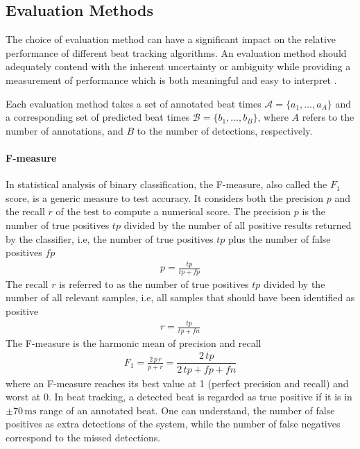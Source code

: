 \documentclass{scrartcl}
\begin{document}
\subsection{Evaluation Methods}

The choice of evaluation method can have a significant impact on the relative performance of different beat tracking algorithms. An evaluation method should adequately contend with the inherent uncertainty or ambiguity while providing a measurement of performance which is both meaningful and easy to interpret \cite{Davies2009b}. 

Each evaluation method takes a set of annotated beat times $\mathcal A = \{a_1, \dots, a_A\}$ and a corresponding set of predicted beat times $\mathcal B = \{b_1, \dots, b_B\}$, where $A$ refers to the number of annotations, and $B$ to the number of detections, respectively.


\paragraph{F-measure} 
In statistical analysis of binary classification, the F-measure, also called the $F_1$ score, is a generic measure to test accuracy. It considers both the precision $p$ and the recall $r$ of the test to compute a numerical score. The precision $p$ is the number of true positives $tp$ divided by the number of all positive results returned by the classifier, i.e, the number of true positives $tp$ plus the number of false positives $fp$
\begin{align}
p = \frac{tp}{tp + fp}
\end{align} 
The recall $r$ is referred to as the number of true positives $tp$ divided by the number of all relevant samples, i.e, all samples that should have been identified as positive
\begin{align}
r = \frac{tp}{tp + fn}
\end{align} 
The F-measure is the harmonic mean of precision and recall
\begin{align}
F_1=  \frac{2\,p\, r}{p +r} = \dfrac{2\, tp}{2\, tp + fp + fn}
\end{align} 
where an F-measure reaches its best value at 1 (perfect precision and recall) and worst at 0. In beat tracking, a detected beat is regarded as true positive if it is in $\pm 70\,\text{ms}$ range of an annotated beat. One can understand, the number of false positives as extra detections of the system, while the number of false negatives correspond to the missed detections.
\end{document}
